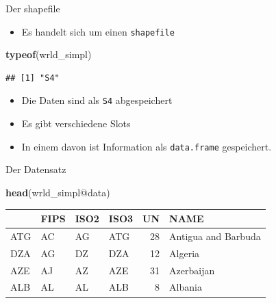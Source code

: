 \documentclass[ignorenonframetext,]{beamer}
\newenvironment{Shaded}{\begin{snugshade}}{\end{snugshade}}
\newcommand{\KeywordTok}[1]{\textcolor[rgb]{0.26,0.66,0.93}{\textbf{#1}}}
\newcommand{\NormalTok}[1]{\textcolor[rgb]{0.74,0.68,0.62}{#1}}
\newcommand{\OperatorTok}[1]{\textcolor[rgb]{0.74,0.68,0.62}{#1}}
\providecommand{\tightlist}{%
  \setlength{\itemsep}{0pt}\setlength{\parskip}{0pt}}
\begin{document}
\begin{frame}[fragile]{Der shapefile}
\protect\hypertarget{der-shapefile}{}

\begin{itemize}
\tightlist
\item
  Es handelt sich um einen \texttt{shapefile}
\end{itemize}

\begin{Shaded}
\begin{Highlighting}[]
\KeywordTok{typeof}\NormalTok{(wrld_simpl)}
\end{Highlighting}
\end{Shaded}

\begin{verbatim}
## [1] "S4"
\end{verbatim}

\begin{itemize}
\tightlist
\item
  Die Daten sind als \texttt{S4} abgespeichert
\item
  Es gibt verschiedene Slots
\item
  In einem davon ist Information als \texttt{data.frame} gespeichert.
\end{itemize}

\end{frame}

\begin{frame}[fragile]{Der Datensatz}
\protect\hypertarget{der-datensatz}{}

\begin{Shaded}
\begin{Highlighting}[]
\KeywordTok{head}\NormalTok{(wrld_simpl}\OperatorTok{@}\NormalTok{data)}
\end{Highlighting}
\end{Shaded}

\begin{longtable}[]{@{}llllrl@{}}
\toprule
& FIPS & ISO2 & ISO3 & UN & NAME\tabularnewline
\midrule
\endhead
ATG & AC & AG & ATG & 28 & Antigua and Barbuda\tabularnewline
DZA & AG & DZ & DZA & 12 & Algeria\tabularnewline
AZE & AJ & AZ & AZE & 31 & Azerbaijan\tabularnewline
ALB & AL & AL & ALB & 8 & Albania\tabularnewline
\bottomrule
\end{longtable}

\end{frame}
\end{document}
